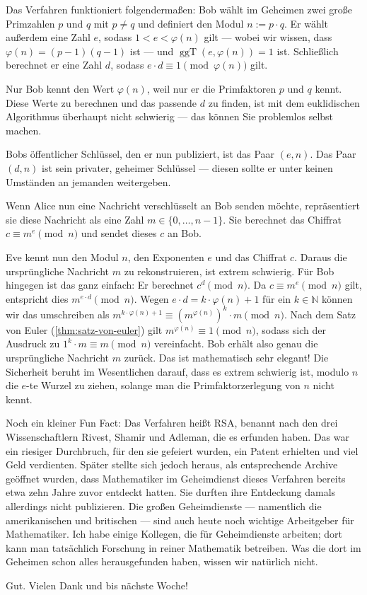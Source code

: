 \begin{spoken-clean}[01:24:42 - 01:26:18]
Das Verfahren funktioniert folgendermaßen: Bob wählt im Geheimen zwei große Primzahlen $p$ und $q$ mit $p \neq q$ und definiert den Modul $n := p \cdot q$. Er wählt außerdem eine Zahl $e$, sodass $1 < e < \varphi(n)$ gilt --- wobei wir wissen, dass $\varphi(n) = (p-1)(q-1)$ ist --- und $\operatorname{ggT}(e, \varphi(n)) = 1$ ist. Schließlich berechnet er eine Zahl $d$, sodass $e \cdot d \equiv 1 \pmod{\varphi(n)}$ gilt.

Nur Bob kennt den Wert $\varphi(n)$, weil nur er die Primfaktoren $p$ und $q$ kennt. Diese Werte zu berechnen und das passende $d$ zu finden, ist mit dem euklidischen Algorithmus überhaupt nicht schwierig --- das können Sie problemlos selbst machen.

Bobs öffentlicher Schlüssel, den er nun publiziert, ist das Paar $(e, n)$. Das Paar $(d, n)$ ist sein privater, geheimer Schlüssel --- diesen sollte er unter keinen Umständen an jemanden weitergeben.

Wenn Alice nun eine Nachricht verschlüsselt an Bob senden möchte, repräsentiert sie diese Nachricht als eine Zahl $m \in \{0, \dots, n-1\}$. Sie berechnet das Chiffrat $c \equiv m^e \pmod n$ und sendet dieses $c$ an Bob.

Eve kennt nun den Modul $n$, den Exponenten $e$ und das Chiffrat $c$. Daraus die ursprüngliche Nachricht $m$ zu rekonstruieren, ist extrem schwierig. Für Bob hingegen ist das ganz einfach: Er berechnet $c^d \pmod n$. Da $c \equiv m^e \pmod n$ gilt, entspricht dies $m^{e \cdot d} \pmod n$. Wegen $e \cdot d = k \cdot \varphi(n) + 1$ für ein $k \in \mathbb{N}$ können wir das umschreiben als $m^{k \cdot \varphi(n) + 1} \equiv (m^{\varphi(n)})^k \cdot m \pmod n$. Nach dem Satz von Euler (\cref{thm:satz-von-euler}) gilt $m^{\varphi(n)} \equiv 1 \pmod n$, sodass sich der Ausdruck zu $1^k \cdot m \equiv m \pmod n$ vereinfacht. Bob erhält also genau die ursprüngliche Nachricht $m$ zurück. Das ist mathematisch sehr elegant! Die Sicherheit beruht im Wesentlichen darauf, dass es extrem schwierig ist, modulo $n$ die $e$-te Wurzel zu ziehen, solange man die Primfaktorzerlegung von $n$ nicht kennt.

Noch ein kleiner Fun Fact: Das Verfahren heißt RSA, benannt nach den drei Wissenschaftlern Rivest, Shamir und Adleman, die es erfunden haben. Das war ein riesiger Durchbruch, für den sie gefeiert wurden, ein Patent erhielten und viel Geld verdienten. Später stellte sich jedoch heraus, als entsprechende Archive geöffnet wurden, dass Mathematiker im Geheimdienst dieses Verfahren bereits etwa zehn Jahre zuvor entdeckt hatten. Sie durften ihre Entdeckung damals allerdings nicht publizieren. Die großen Geheimdienste --- namentlich die amerikanischen und britischen --- sind auch heute noch wichtige Arbeitgeber für Mathematiker. Ich habe einige Kollegen, die für Geheimdienste arbeiten; dort kann man tatsächlich Forschung in reiner Mathematik betreiben. Was die dort im Geheimen schon alles herausgefunden haben, wissen wir natürlich nicht.

Gut. Vielen Dank und bis nächste Woche! 
\end{spoken-clean}

